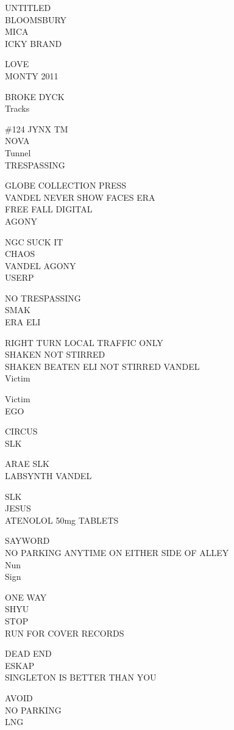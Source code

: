 \documentclass[10pt,letterpaper]{article}
\begin{document}
UNTITLED\\
BLOOMSBURY\\
MICA\\
ICKY BRAND

LOVE\\
MONTY 2011

BROKE DYCK\\
Tracks

\#124 JYNX TM\\
NOVA\\
Tunnel\\
TRESPASSING

GLOBE COLLECTION PRESS\\
VANDEL NEVER SHOW FACES ERA\\
FREE FALL DIGITAL\\
AGONY

NGC SUCK IT\\
CHAOS\\
VANDEL AGONY\\
USERP

NO TRESPASSING\\
SMAK\\
ERA ELI

RIGHT TURN LOCAL TRAFFIC ONLY\\
SHAKEN NOT STIRRED\\
SHAKEN BEATEN ELI NOT STIRRED VANDEL\\
Victim

Victim\\
EGO

CIRCUS\\
SLK

ARAE SLK\\
LABSYNTH VANDEL

SLK\\
JESUS\\
ATENOLOL 50mg TABLETS

SAYWORD\\
NO PARKING ANYTIME ON EITHER SIDE OF ALLEY\\
Nun\\
Sign

ONE WAY\\
SHYU\\
STOP\\
RUN FOR COVER RECORDS

DEAD END\\
ESKAP\\
SINGLETON IS BETTER THAN YOU

AVOID\\
NO PARKING\\
LNG
\end{document}
